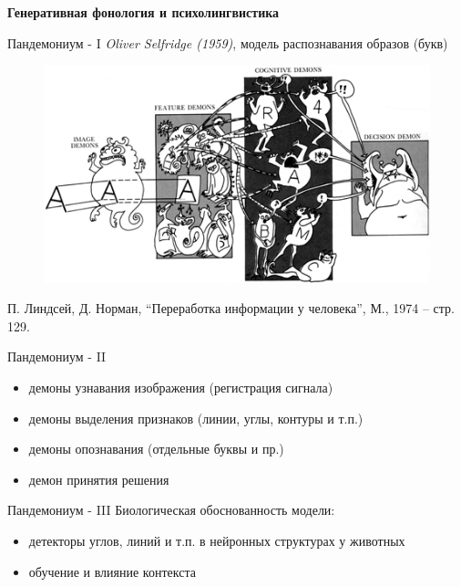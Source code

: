 \documentclass{beamer}
\begin{document}
\begin{frame}{}
\begin{center}
	\textbf{Генеративная фонология и психолингвистика}
\end{center}
\end{frame}

\begin{frame}{Пандемониум - I}
\textit{Oliver Selfridge (1959)}, модель распознавания образов (букв)
\begin{center}
	\begin{figure}[H]
		\includegraphics[scale=0.5]{pandemonium_small.png} 
	\end{figure}
\end{center}
\bigskip
\tiny{П. Линдсей, Д. Норман, ``Переработка информации у человека'', М., 1974 -- стр. 129.}
\end{frame}

\begin{frame}{Пандемониум - II}
\begin{itemize}
	\item демоны узнавания изображения (регистрация сигнала)
	\medskip
	\item демоны выделения признаков (линии, углы, контуры и т.п.)
	\medskip
	\item демоны опознавания (отдельные буквы и пр.)
	\medskip
	\item демон принятия решения
\end{itemize}
\end{frame}

\begin{frame}{Пандемониум - III}
Биологическая обоснованность модели:
\bigskip
\begin{itemize}
	\item детекторы углов, линий и т.п. в нейронных структурах у животных
	\medskip
	\item обучение и влияние контекста
\end{itemize}
\end{frame}
\end{document}
